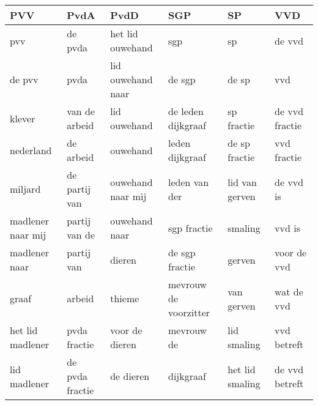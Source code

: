\begin{tabular}{llllll}
\toprule
               PVV &             PvdA &               PvdD &                    SGP &               SP &             VVD \\
\midrule
               pvv &          de pvda &   het lid ouwehand &                    sgp &               sp &          de vvd \\
            de pvv &             pvda &  lid ouwehand naar &                 de sgp &            de sp &             vvd \\
            klever &    van de arbeid &       lid ouwehand &     de leden dijkgraaf &       sp fractie &  de vvd fractie \\
         nederland &        de arbeid &           ouwehand &        leden dijkgraaf &    de sp fractie &     vvd fractie \\
           miljard &    de partij van &  ouwehand naar mij &          leden van der &   lid van gerven &       de vvd is \\
 madlener naar mij &    partij van de &      ouwehand naar &            sgp fractie &          smaling &          vvd is \\
     madlener naar &       partij van &             dieren &         de sgp fractie &           gerven &     voor de vvd \\
             graaf &           arbeid &             thieme &  mevrouw de voorzitter &       van gerven &      wat de vvd \\
  het lid madlener &     pvda fractie &     voor de dieren &             mevrouw de &      lid smaling &     vvd betreft \\
      lid madlener &  de pvda fractie &          de dieren &              dijkgraaf &  het lid smaling &  de vvd betreft \\
\bottomrule
\end{tabular}
